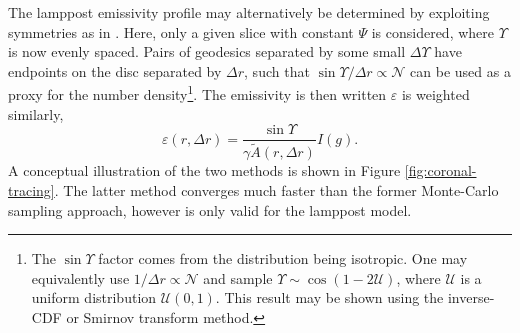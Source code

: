 \documentclass[fleqn,usenatbib]{mnras}
\begin{document}
The lamppost emissivity profile may alternatively
be determined by exploiting symmetries as in \cite{dauser_irradiation_2013}.
Here, only a given slice with constant $\Psi$ is considered, where $\Upsilon$ is
now evenly spaced. Pairs of geodesics separated by some small $\Delta \Upsilon$
have endpoints on the disc separated by $\Delta r$, such that $\sin \Upsilon
/ \Delta r \propto \mathcal{N}$ can be used as a proxy for the number
density\footnote{The $\sin \Upsilon$ factor comes from the distribution being
    isotropic. One may equivalently use $1/\Delta r \propto \mathcal{N}$ and
    sample $\Upsilon \sim \cos (1 - 2 \mathcal{U})$, where $\mathcal{U}$ is a
    uniform distribution $\mathcal{U}(0,1)$. This result may be shown using the
    inverse-CDF or Smirnov transform method.}. The emissivity is then written
$\varepsilon$ is weighted similarly,\begin{equation}
    \varepsilon(r, \Delta r) = \frac{\sin \Upsilon}{\gamma \tilde{A}(r, \Delta r)} I(g).
\end{equation}
A conceptual illustration of the two methods is shown in Figure
\ref{fig:coronal-tracing}. The latter method converges much faster than the
former Monte-Carlo sampling approach, however is only valid for the lamppost
model.
\end{document}

